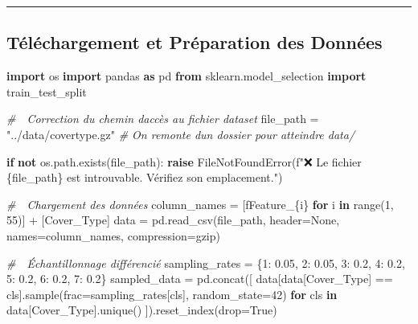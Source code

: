 \documentclass[
]{article}
\newenvironment{Shaded}{}{}
\newcommand{\BuiltInTok}[1]{\textcolor[rgb]{0.00,0.50,0.00}{#1}}
\newcommand{\CommentTok}[1]{\textcolor[rgb]{0.38,0.63,0.69}{\textit{#1}}}
\newcommand{\ControlFlowTok}[1]{\textcolor[rgb]{0.00,0.44,0.13}{\textbf{#1}}}
\newcommand{\DecValTok}[1]{\textcolor[rgb]{0.25,0.63,0.44}{#1}}
\newcommand{\FloatTok}[1]{\textcolor[rgb]{0.25,0.63,0.44}{#1}}
\newcommand{\ImportTok}[1]{\textcolor[rgb]{0.00,0.50,0.00}{\textbf{#1}}}
\newcommand{\KeywordTok}[1]{\textcolor[rgb]{0.00,0.44,0.13}{\textbf{#1}}}
\newcommand{\NormalTok}[1]{#1}
\newcommand{\OperatorTok}[1]{\textcolor[rgb]{0.40,0.40,0.40}{#1}}
\newcommand{\PreprocessorTok}[1]{\textcolor[rgb]{0.74,0.48,0.00}{#1}}
\newcommand{\SpecialCharTok}[1]{\textcolor[rgb]{0.25,0.44,0.63}{#1}}
\newcommand{\SpecialStringTok}[1]{\textcolor[rgb]{0.73,0.40,0.53}{#1}}
\newcommand{\StringTok}[1]{\textcolor[rgb]{0.25,0.44,0.63}{#1}}
\newcommand{\VariableTok}[1]{\textcolor[rgb]{0.10,0.09,0.49}{#1}}
\begin{document}
\begin{center}\rule{0.5\linewidth}{0.5pt}\end{center}

\subsection{Téléchargement et Préparation des
Données}\label{tuxe9luxe9chargement-et-pruxe9paration-des-donnuxe9es}

\begin{Shaded}
\begin{Highlighting}[]
\ImportTok{import}\NormalTok{ os}
\ImportTok{import}\NormalTok{ pandas }\ImportTok{as}\NormalTok{ pd}
\ImportTok{from}\NormalTok{ sklearn.model\_selection }\ImportTok{import}\NormalTok{ train\_test\_split}

\CommentTok{\# 📂 Correction du chemin d\textquotesingle{}accès au fichier dataset}
\NormalTok{file\_path }\OperatorTok{=} \StringTok{"../data/covertype.gz"}  \CommentTok{\# On remonte d\textquotesingle{}un dossier pour atteindre data/}

\ControlFlowTok{if} \KeywordTok{not}\NormalTok{ os.path.exists(file\_path):}
    \ControlFlowTok{raise} \PreprocessorTok{FileNotFoundError}\NormalTok{(}\SpecialStringTok{f"❌ Le fichier }\SpecialCharTok{\{}\NormalTok{file\_path}\SpecialCharTok{\}}\SpecialStringTok{ est introuvable. Vérifiez son emplacement."}\NormalTok{)}

\CommentTok{\# 🔄 Chargement des données}
\NormalTok{column\_names }\OperatorTok{=}\NormalTok{ [}\SpecialStringTok{f\textquotesingle{}Feature\_}\SpecialCharTok{\{}\NormalTok{i}\SpecialCharTok{\}}\SpecialStringTok{\textquotesingle{}} \ControlFlowTok{for}\NormalTok{ i }\KeywordTok{in} \BuiltInTok{range}\NormalTok{(}\DecValTok{1}\NormalTok{, }\DecValTok{55}\NormalTok{)] }\OperatorTok{+}\NormalTok{ [}\StringTok{\textquotesingle{}Cover\_Type\textquotesingle{}}\NormalTok{]}
\NormalTok{data }\OperatorTok{=}\NormalTok{ pd.read\_csv(file\_path, header}\OperatorTok{=}\VariableTok{None}\NormalTok{, names}\OperatorTok{=}\NormalTok{column\_names, compression}\OperatorTok{=}\StringTok{\textquotesingle{}gzip\textquotesingle{}}\NormalTok{)}

\CommentTok{\# 🔢 Échantillonnage différencié}
\NormalTok{sampling\_rates }\OperatorTok{=}\NormalTok{ \{}\DecValTok{1}\NormalTok{: }\FloatTok{0.05}\NormalTok{, }\DecValTok{2}\NormalTok{: }\FloatTok{0.05}\NormalTok{, }\DecValTok{3}\NormalTok{: }\FloatTok{0.2}\NormalTok{, }\DecValTok{4}\NormalTok{: }\FloatTok{0.2}\NormalTok{, }\DecValTok{5}\NormalTok{: }\FloatTok{0.2}\NormalTok{, }\DecValTok{6}\NormalTok{: }\FloatTok{0.2}\NormalTok{, }\DecValTok{7}\NormalTok{: }\FloatTok{0.2}\NormalTok{\}}
\NormalTok{sampled\_data }\OperatorTok{=}\NormalTok{ pd.concat([}
\NormalTok{    data[data[}\StringTok{\textquotesingle{}Cover\_Type\textquotesingle{}}\NormalTok{] }\OperatorTok{==}\NormalTok{ cls].sample(frac}\OperatorTok{=}\NormalTok{sampling\_rates[cls], random\_state}\OperatorTok{=}\DecValTok{42}\NormalTok{)}
    \ControlFlowTok{for}\NormalTok{ cls }\KeywordTok{in}\NormalTok{ data[}\StringTok{\textquotesingle{}Cover\_Type\textquotesingle{}}\NormalTok{].unique()}
\NormalTok{]).reset\_index(drop}\OperatorTok{=}\VariableTok{True}\NormalTok{)}


\end{Highlighting}
\end{Shaded}
\end{document}
